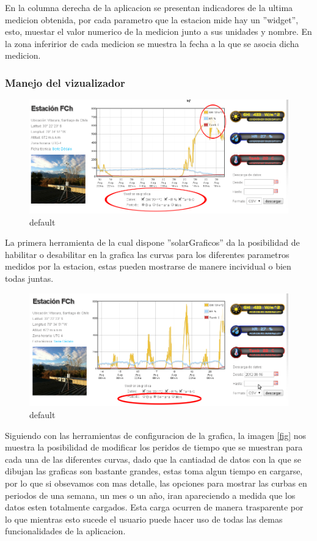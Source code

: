 En la columna derecha de la aplicacion se presentan indicadores de la ultima medicion obtenida, por cada parametro que la estacion mide hay un ''widget'', esto, muestar el valor numerico de la medicion junto a sus unidades y nombre. En la zona inferirior de cada medicion se muestra la fecha a la que se asocia dicha medicion.

\subsubsection{Manejo del vizualizador}
\begin{figure}[ht]
        \centering
        \includegraphics[width=\textwidth]{./images/cap5chap1img1}
        \caption{default}
        \label{fig:figure1}
\end{figure}
La primera herramienta de la cual dispone ''solarGraficos'' da la posibilidad de habilitar o desabilitar en la grafica las curvas para los diferentes parametros medidos por la estacion, estas pueden mostrarse de manere incividual o bien todas juntas.

\begin{figure}[ht]
        \centering
        \includegraphics[width=\textwidth]{./images/cap5chap1img3}
        \caption{default}
        \label{fig:figure1}
\end{figure}
Siguiendo con las herramientas de configuracion de la grafica, la imagen \ref{fig} nos muestra la posibilidad de modificar los peridos de tiempo que se muestran para cada una de las diferentes curvas, dado que la cantiadad de datos con la que se dibujan las graficas son bastante grandes, estas toma algun tiempo en cargarse, por lo que si obsevamos con mas detalle, las opciones para mostrar las curbas en periodos de una semana, un mes o un año, iran apareciendo a medida que los datos esten totalmente cargados. Esta carga ocurren de manera trasparente por lo que mientras esto sucede el usuario puede hacer uso de todas las demas funcionalidades de la aplicacion.

